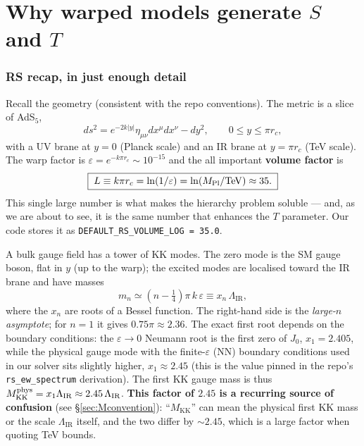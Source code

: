 \documentclass[11pt]{article}
\newcommand{\MKK}{M_{\mathrm{KK}}}
\newcommand{\LIR}{\Lambda_{\mathrm{IR}}}
\newcommand{\eps}{\varepsilon}
\newcommand{\code}[1]{\texttt{#1}}
\theoremstyle{definition}
\begin{document}
\part{Why warped models generate $S$ and $T$}
\label{part:rs}

\section{RS recap, in just enough detail}
\label{sec:rsrecap}

Recall the geometry (consistent with the repo conventions). The metric is a slice
of AdS$_5$,
\begin{equation}
ds^2 = e^{-2k|y|}\eta_{\mu\nu}dx^\mu dx^\nu - dy^2, \qquad 0 \le y \le \pi r_c,
\end{equation}
with a UV brane at $y=0$ (Planck scale) and an IR brane at $y=\pi r_c$
(TeV scale). The warp factor is $\eps = e^{-k\pi r_c} \sim 10^{-15}$ and the all
important \textbf{volume factor} is
\begin{equation}
\boxed{\;L \equiv k\pi r_c = \ln(1/\eps) = \ln(M_{\rm Pl}/\mathrm{TeV}) \approx 35.\;}
\label{eq:L}
\end{equation}
This single large number is what makes the hierarchy problem soluble --- and, as
we are about to see, it is the same number that enhances the $T$ parameter. Our
code stores it as \code{DEFAULT\_RS\_VOLUME\_LOG = 35.0}.

A bulk gauge field has a tower of KK modes. The zero mode is the SM gauge boson,
flat in $y$ (up to the warp); the excited modes are localised toward the IR
brane and have masses
\begin{equation}
m_n \simeq \left(n - \tfrac14\right)\pi\,k\,\eps \equiv x_n\,\LIR ,
\label{eq:KKmass}
\end{equation}
where the $x_n$ are roots of a Bessel function. The right-hand side is the
\emph{large-$n$ asymptote}; for $n=1$ it gives $0.75\pi\approx 2.36$. The exact
first root depends on the boundary conditions: the $\eps\!\to\!0$ Neumann root is
the first zero of $J_0$, $x_1 = 2.405$, while the physical gauge mode with the
finite-$\eps$ (NN) boundary conditions used in our solver sits slightly higher,
$x_1 \approx 2.45$ (this is the value pinned in the repo's
\code{rs\_ew\_spectrum} derivation). The first KK gauge mass is thus
$\MKK^{\rm phys} = x_1 \LIR \approx 2.45\,\LIR$.
\textbf{This factor of $2.45$ is a recurring source of confusion} (see
\S\ref{sec:Mconvention}): ``$\MKK$'' can mean the physical first KK mass or the
scale $\LIR$ itself, and the two differ by $\sim 2.45$, which is a large factor
when quoting TeV bounds.
\end{document}
